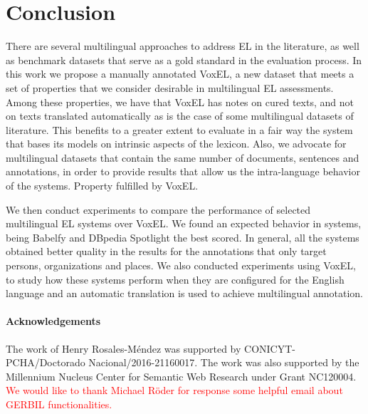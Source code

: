 \documentclass{llncs}
\begin{document}
\section{Conclusion}
\label{sec:conclusion}

There are several multilingual approaches to address EL in the literature, as well as benchmark datasets that serve as a gold standard in the evaluation process. In this work we propose a manually annotated VoxEL, a new dataset that meets a set of properties that we consider desirable in multilingual EL assessments. Among these properties, we have that VoxEL has notes on cured texts, and not on texts translated automatically as is the case of some multilingual datasets of literature. This benefits to a greater extent to evaluate in a fair way the system that bases its models on intrinsic aspects of the lexicon. Also, we advocate for multilingual datasets that contain the same number of documents, sentences and annotations, in order to provide results that allow us the intra-language behavior of the systems. Property fulfilled by VoxEL.

We then conduct experiments to compare the performance of selected multilingual EL systems over VoxEL. We found an expected behavior in systems, being Babelfy and DBpedia Spotlight the best scored. In general, all the systems obtained better quality in the results for the annotations that only target persons, organizations and places. We also conducted experiments using VoxEL, to study how these systems perform when they are configured for the English language and an automatic translation is used to achieve multilingual annotation. 


{\footnotesize
\paragraph{Acknowledgements} The work of Henry Rosales-M\'endez was supported by CONICYT-PCHA/Doctorado Nacional/2016-21160017. The work was also supported by the Millennium Nucleus Center for Semantic Web Research under Grant NC120004. \textcolor{red}{We would like to thank Michael R\"oder for response some helpful email about GERBIL functionalities.}}

%
%
%
\end{document}
